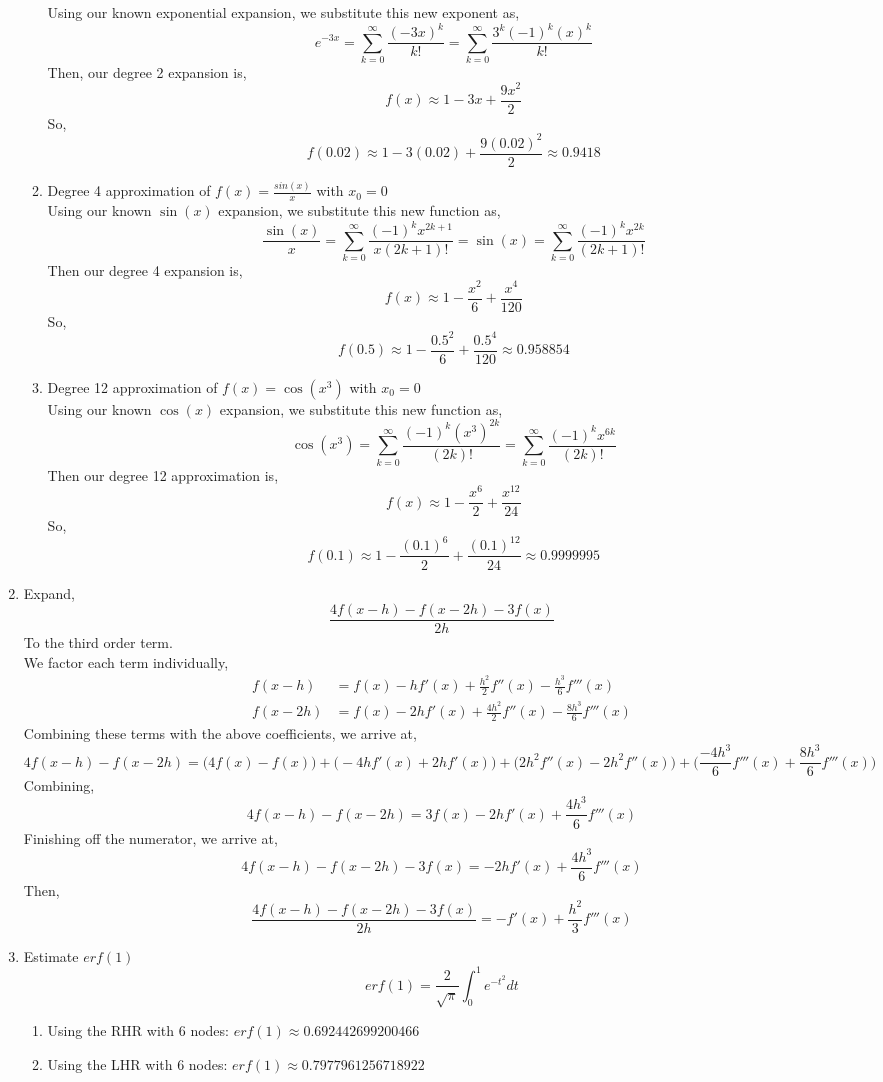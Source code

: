 \documentclass[letterpaper,10pt]{article}
\begin{document}
\begin{enumerate}
\begin{enumerate}
Using our known exponential expansion, we substitute this new exponent as,
\[e^{-3x}=\sum_{k=0}^{\infty}\frac{(-3x)^k}{k!}=\sum_{k=0}^{\infty}\frac{3^k(-1)^k(x)^k}{k!}\]
Then, our degree 2 expansion is,
\[f(x)\approx 1-3x+\frac{9x^2}{2}\]
So,
\[f(0.02)\approx 1-3(0.02)+\frac{9(0.02)^2}{2}\approx 0.9418\]
\item Degree 4 approximation of $f(x)=\frac{sin(x)}{x}$ with $x_0=0$\\
Using our known $\sin(x)$ expansion, we substitute this new function as,
\[\frac{\sin(x)}{x}=\sum_{k=0}^{\infty}\frac{(-1)^kx^{2k+1}}{x(2k+1)!}=\sin(x)=\sum_{k=0}^{\infty}\frac{(-1)^kx^{2k}}{(2k+1)!}\]
Then our degree 4 expansion is,
\[f(x)\approx 1-\frac{x^2}{6}+\frac{x^4}{120}\]
So,
\[f(0.5)\approx 1-\frac{0.5^2}{6}+\frac{0.5^4}{120}\approx 0.958854\]
\item Degree 12 approximation of $f(x)=\cos(x^3)$ with $x_0=0$\\
Using our known $\cos(x)$ expansion, we substitute this new function as,
\[\cos(x^3)=\sum_{k=0}^{\infty}\frac{(-1)^k(x^3)^{2k}}{(2k)!}=\sum_{k=0}^{\infty}\frac{(-1)^kx^{6k}}{(2k)!}\]
Then our degree 12 approximation is,
\[f(x)\approx 1-\frac{x^6}{2}+\frac{x^{12}}{24}\]
So,
\[f(0.1)\approx 1-\frac{(0.1)^6}{2}+\frac{(0.1)^{12}}{24}\approx 0.9999995\]
\end{enumerate}
\item Expand,
\[\frac{4f(x-h)-f(x-2h)-3f(x)}{2h}\]
To the third order term.\\
We factor each term individually,
\begin{align*}
f(x-h)&=f(x)-hf'(x)+\frac{h^2}{2}f''(x)-\frac{h^3}{6}f'''(x)\\
f(x-2h)&=f(x)-2hf'(x)+\frac{4h^2}{2}f''(x)-\frac{8h^3}{6}f'''(x)
\end{align*}
Combining these terms with the above coefficients, we arrive at,
\[4f(x-h)-f(x-2h)=\bigg(4f(x)-f(x)\bigg)+\bigg(-4hf'(x)+2hf'(x)\bigg)+\bigg(2h^2f''(x)-2h^2f''(x)\bigg)+\bigg(\frac{-4h^3}{6}f'''(x)+\frac{8h^3}{6}f'''(x)\bigg)\]
Combining,
\[4f(x-h)-f(x-2h)=3f(x)-2hf'(x)+\frac{4h^3}{6}f'''(x)\]
Finishing off the numerator, we arrive at,
\[4f(x-h)-f(x-2h)-3f(x)=-2hf'(x)+\frac{4h^3}{6}f'''(x)\]
Then,
\[\frac{4f(x-h)-f(x-2h)-3f(x)}{2h}=-f'(x)+\frac{h^2}{3}f'''(x)\]
\item Estimate $erf(1)$
\[erf(1)=\frac{2}{\sqrt{\pi}}\int_{0}^{1}e^{-t^2}dt\]
\begin{enumerate}
\item Using the RHR with 6 nodes: $erf(1)\approx 0.692442699200466$
\item Using the LHR with 6 nodes: $erf(1)\approx 0.7977961256718922$

\end{enumerate}
\end{enumerate}
\end{document}
